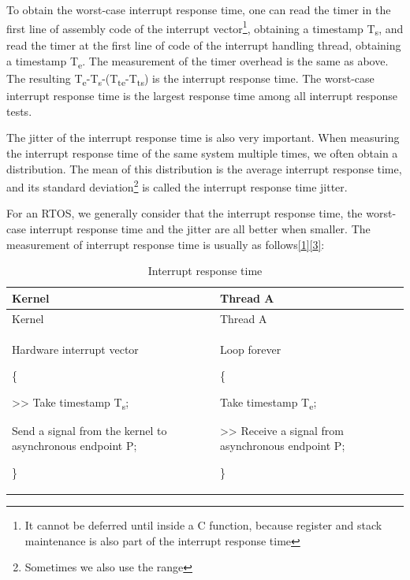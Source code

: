 To obtain the worst-case interrupt response time, one can read the timer in the first line of assembly code of the interrupt vector\footnote{It cannot be deferred until inside a C function, because register and stack maintenance is also part of the interrupt response time}, obtaining a timestamp T\textsubscript{s}, and read the timer at the first line of code of the interrupt handling thread, obtaining a timestamp T\textsubscript{e}. The measurement of the timer overhead is the same as above. The resulting T\textsubscript{e}-T\textsubscript{s}-(T\textsubscript{te}-T\textsubscript{ts}) is the interrupt response time. The worst-case interrupt response time is the largest response time among all interrupt response tests.

The jitter of the interrupt response time is also very important. When measuring the interrupt response time of the same system multiple times, we often obtain a distribution. The mean of this distribution is the average interrupt response time, and its standard deviation\footnote{Sometimes we also use the range} is called the interrupt response time jitter.

For an RTOS, we generally consider that the interrupt response time, the worst-case interrupt response time and the jitter are all better when smaller. The measurement of interrupt response time is usually as follows\hyperref[cite:1-1]{{[}1{]}}\hyperref[cite:1-3]{{[}3{]}}:

\begin{xltabular}{\textwidth}{@{}>{\hsize\raggedright\arraybackslash}X>{\hsize\raggedright\arraybackslash}X@{}}
\caption{Interrupt response time}\label{tab:1-12-interrupt-response-time}\\
\toprule
Kernel & Thread A\tabularnewline
\endfirsthead
\toprule
Kernel & Thread A\tabularnewline
\midrule
\endhead
\bottomrule
\endlastfoot
Hardware interrupt vector

\{

\textgreater\textgreater{} Take timestamp T\textsubscript{s};

Send a signal from the kernel to asynchronous endpoint P;

\}\strut
 & Loop forever

\{

Take timestamp T\textsubscript{e};

\textgreater\textgreater{} Receive a signal from asynchronous endpoint P;

\}\strut
\tabularnewline
\end{xltabular}
\nopagebreak[4]

